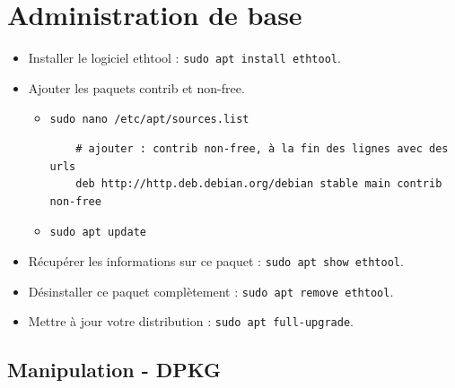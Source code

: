 \documentclass[a4paper]{article}
\begin{document}
\section{Administration de base}





\begin{itemize}

\item Installer le logiciel ethtool : \texttt{sudo apt install ethtool}.

\item Ajouter les paquets contrib et non-free.
\begin{example}
    \begin{itemize}
        \item \texttt{sudo nano /etc/apt/sources.list}
        \begin{verbatim}
    # ajouter : contrib non-free, à la fin des lignes avec des urls
    deb http://http.deb.debian.org/debian stable main contrib non-free
        \end{verbatim}
        \item \texttt{sudo apt update}
    \end{itemize}
\end{example}

\item Récupérer les informations sur ce paquet : \texttt{sudo apt show ethtool}.

\item Désinstaller ce paquet complètement : \texttt{sudo apt remove ethtool}.

\item Mettre à jour votre distribution : \texttt{sudo apt full-upgrade}.

\end{itemize}










\subsection{Manipulation - DPKG}
\end{document}
